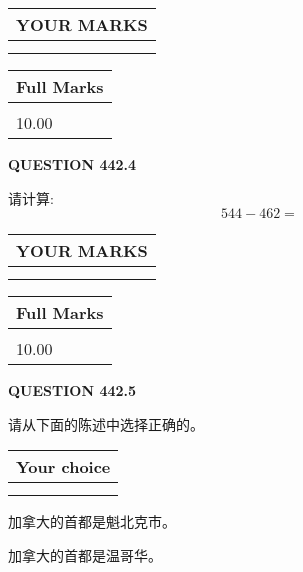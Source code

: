 \documentclass{ctexart}
\begin{document}
\vspace{0.2in}
  
\noindent\begin{tabular}{|l|}
\hline
 YOUR MARKS  \\
\hline
 \\ 
 \\ 
\hline
\end{tabular}
\hspace{0.05in} \begin{tabular}{|l|}
\hline
 Full Marks  \\
\hline
 \\ 
10.00 \\
\hline
\end{tabular}
{\textbf{\Large{QUESTION
442.4 
}}}
  
  
 
请计算:
\begin{equation}
544 -   %
462 = \nonumber
\end{equation}
 

 

 
  
\vspace{0.2in}
  
\noindent\begin{tabular}{|l|}
\hline
 YOUR MARKS  \\
\hline
 \\ 
 \\ 
\hline
\end{tabular}
\hspace{0.05in} \begin{tabular}{|l|}
\hline
 Full Marks  \\
\hline
 \\ 
10.00 \\
\hline
\end{tabular}
{\textbf{\Large{QUESTION
442.5 
}}}
  
  
请从下面的陈述中选择正确的。
  
  
\noindent\hspace{3.0in} \begin{tabular}{|l|}
\hline
Your choice \\
\hline
 \\ 
 \\ 
\hline
\end{tabular}
  
  
 
 
加拿大的首都是魁北克市。
 
 
加拿大的首都是温哥华。
 
\end{document}
